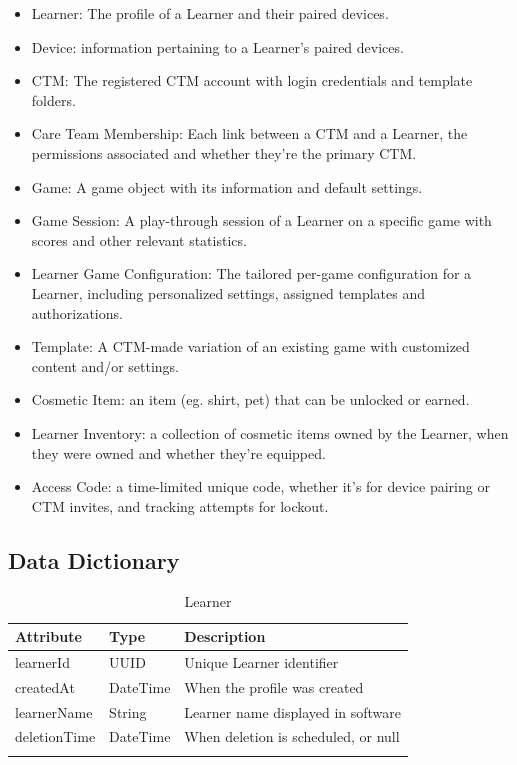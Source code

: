\documentclass[12pt]{article}
\begin{document}
\begin{itemize}
\item Learner: The profile of a Learner and their paired devices.
\item Device: information pertaining to a Learner's paired devices.
\item CTM: The registered CTM account with login credentials and template folders.
\item Care Team Membership: Each link between a CTM and a Learner, the permissions associated and whether they're the primary CTM.
\item Game: A game object with its information and default settings.
\item Game Session: A play-through session of a Learner on a specific game with scores and other relevant statistics.
\item Learner Game Configuration: The tailored per-game configuration for a Learner, including personalized settings, assigned templates and authorizations.
\item Template: A CTM-made variation of an existing game with customized content and/or settings.
\item Cosmetic Item: an item (eg. shirt, pet) that can be unlocked or earned.
\item Learner Inventory: a collection of cosmetic items owned by the Learner, when they were owned and whether they're equipped.
\item Access Code: a time-limited unique code, whether it's for device pairing or CTM invites, and tracking attempts for lockout.
\end{itemize}

\subsection{Data Dictionary}

\begin{longtable}{p{} p{} p{}}
\toprule
Attribute & Type & Description\\
\midrule
learnerId & UUID & Unique Learner identifier\\
createdAt & DateTime & When the profile was created\\
learnerName & String & Learner name displayed in software\\
deletionTime & DateTime & When deletion is scheduled, or null\\
\bottomrule
\caption{Learner} \label{tab:Learner}
\end{longtable}
\end{document}
